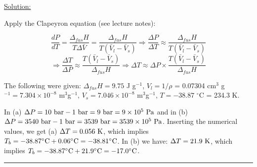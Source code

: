 \noindent
\underline{Solution:}

Apply the Clapeyron equation (see lecture notes):

$$\frac{dP}{dT} = \frac{\Delta_{fus}H}{T\Delta\bar{V}} = \frac{\Delta_{fus}H}{T\left(\bar{V}_l - \bar{V}_s\right)} \Rightarrow \frac{\Delta P}{\Delta T} \approx \frac{\Delta_{fus}H}{T\left(\bar{V}_l - \bar{V}_s\right)}$$
$$\Rightarrow \frac{\Delta T}{\Delta P} \approx \frac{T\left(\bar{V}_l - \bar{V}_s\right)}{\Delta_{fus}H} \Rightarrow \Delta T \approx \Delta P\times \frac{T\left(\bar{V}_l - \bar{V}_s\right)}{\Delta_{fus}H}$$

The following were given: $\Delta_{fus}H = 9.75$ J g$^{-1}$, $V_l = 1 / \rho$ = 0.07304 cm$^3$ g$^{-1} = 7.304\times 10^{-8}$ m$^3$g$^{-1}$, $V_s = 7.046\times 10^{-8}$ m$^3$g$^{-1}$, $T = -38.87$ $^\circ$C = 234.3 K.

In (a) $\Delta P = 10\textnormal{ bar} - 1\textnormal{ bar} = 9\textnormal{ bar} = 9\times 10^5\textnormal{ Pa}$ and in (b) $\Delta P = 3540\textnormal{ bar} - 1\textnormal{ bar} = 3539\textnormal{ bar} = 3539\times 10^5\textnormal{ Pa}$. Inserting the numerical values, we get (a) $\Delta T = 0.056\textnormal{ K}$, which implies $T_b = -38.87^\circ\textnormal{C} + 0.06^\circ\textnormal{C} = -38.81^\circ\textnormal{C}$. In (b) we have: $\Delta T = 21.9\textnormal{ K}$, which implies $T_b = -38.87^\circ\textnormal{C} + 21.9^\circ\textnormal{C} = -17.0^\circ\textnormal{C}$.

\hrule\vspace{0.5cm}
